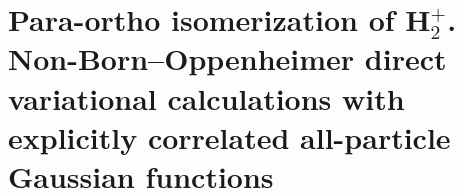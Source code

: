 \chapter{Para-ortho isomerization of H$_2^+$. Non-Born–Oppenheimer direct variational calculations with explicitly correlated all-particle Gaussian functions\label{apndx10}}



